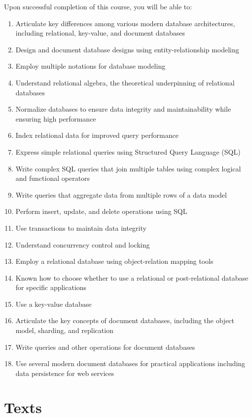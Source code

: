 \documentclass[11pt]{article}
\begin{document}
Upon successful completion of this course,
you will be able to:
\begin{enumerate}
\item Articulate key differences among various modern database architectures,
  including relational, key-value, and document databases
\item Design and document database designs using entity-relationship modeling
\item Employ multiple notations for database modeling
\item Understand relational algebra,
  the theoretical underpinning of relational databases
\item Normalize databases to ensure data integrity and maintainability
  while ensuring high performance
\item Index relational data for improved query performance
\item Express simple relational queries using Structured Query Language (SQL)
\item Write complex SQL queries
  that join multiple tables
  using complex logical and functional operators
\item Write queries that aggregate data from multiple rows of a data model
\item Perform insert, update, and delete operations using SQL
\item Use transactions to maintain data integrity
\item Understand concurrency control and locking
\item Employ a relational database using object-relation mapping tools
\item Known how to choose whether to use a relational or post-relational
  database for specific applications
\item Use a key-value database
\item Articulate the key concepts of document databases,
  including the object model, sharding, and replication
\item Write queries and other operations for document databases
\item Use several modern document databases for practical applications
  including data persistence for web services
\end{enumerate}

\section{Texts}
\end{document}
